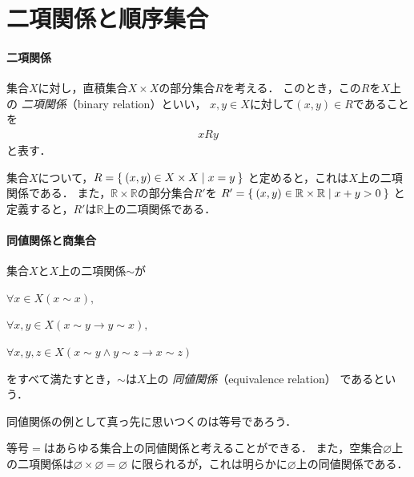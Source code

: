  
   
   
   
 \section{二項関係と順序集合}
 \label{sec:eqset}

  \paragraph{二項関係}
   集合$X$に対し，直積集合$X \times X$の部分集合$R$を考える．
   このとき，この$R$を$X$上の
   \emph{二項関係}（binary relation）といい，
   $x,y \in X$に対して$(x,y ) \in R$であることを
   \begin{align}
     x R y
     \label{eq:relation}
   \end{align}
   と表す．

   \begin{ex} \label{ex:relation}
     集合$X$について，$R= \Set{ (x,y)  \in X \times X \mid x=y}$
     と定めると，これは$X$上の二項関係である．
     また，$\mathbb{R} \times \mathbb{R}$の部分集合$R'$を
     $R' = \Set{ (x,y) \in \mathbb{R} \times \mathbb{R} \mid x+y >0}$
     と定義すると，$R'$は$\mathbb{R}$上の二項関係である．
   \end{ex}

  \paragraph{同値関係と商集合}
   集合$X$と$X$上の二項関係$\sim$が
   \begin{description}
     \item[反射律] $\forall x \in X (x \sim x),$
     \item[対称律] $\forall x ,y \in X ( x \sim y \to y \sim x),$
     \item[推移律] $\forall x,y,z \in X (x \sim y \land y \sim z \to x \sim z)$
   \end{description}
   をすべて満たすとき，$\sim$は$X$上の
   \emph{同値関係}（equivalence relation）
   であるという．

   同値関係の例として真っ先に思いつくのは等号であろう．

   \begin{ex} \label{ex:equivrealtion}
     等号$=$はあらゆる集合上の同値関係と考えることができる．
     また，空集合$\varnothing$上の二項関係は$\varnothing \times \varnothing = \varnothing$
     に限られるが，これは明らかに$\varnothing$上の同値関係である．
   \end{ex}


